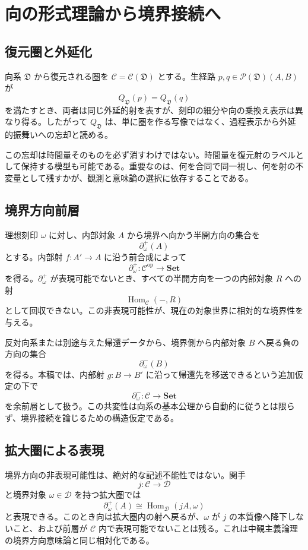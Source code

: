 \documentclass[a4paper,11pt]{ltjsarticle}
\theoremstyle{definition}
\theoremstyle{plain}
\newcommand{\Set}{\mathbf{Set}}
\newcommand{\Hom}{\operatorname{Hom}}
\begin{document}
\section{向の形式理論から境界接続へ}

\subsection{復元圏と外延化}

向系 $\mathfrak D$ から復元される圏を $\mathcal C=\mathcal C(\mathfrak D)$ とする。生経路 $p,q\in\mathcal P(\mathfrak D)(A,B)$ が
\[
 Q_{\mathfrak D}(p)=Q_{\mathfrak D}(q)
\]
を満たすとき、両者は同じ外延的射を表すが、刻印の細分や向の乗換え表示は異なり得る。したがって $Q_{\mathfrak D}$ は、単に圏を作る写像ではなく、過程表示から外延的振舞いへの忘却と読める。

この忘却は時間量そのものを必ず消すわけではない。時間量を復元射のラベルとして保持する模型も可能である。重要なのは、何を合同で同一視し、何を射の不変量として残すかが、観測と意味論の選択に依存することである。

\subsection{境界方向前層}

理想刻印 $\omega$ に対し、内部対象 $A$ から境界へ向かう半開方向の集合を
\[
 \partial_\omega^+(A)
\]
とする。内部射 $f:A'\to A$ に沿う前合成によって
\[
 \partial_\omega^+:
 \mathcal C^{\mathrm{op}}\longrightarrow\Set
\]
を得る。$\partial_\omega^+$ が表現可能でないとき、すべての半開方向を一つの内部対象 $R$ への射
\[
 \Hom_{\mathcal C}(-,R)
\]
として回収できない。この非表現可能性が、現在の対象世界に相対的な境界性を与える。

反対向系または別途与えた帰還データから、境界側から内部対象 $B$ へ戻る負の方向の集合
\[
 \partial_\omega^-(B)
\]
を得る。本稿では、内部射 $g:B\to B'$ に沿って帰還先を移送できるという追加仮定の下で
\[
 \partial_\omega^-:
 \mathcal C\longrightarrow\Set
\]
を余前層として扱う。この共変性は向系の基本公理から自動的に従うとは限らず、境界接続を論じるための構造仮定である。

\subsection{拡大圏による表現}

境界方向の非表現可能性は、絶対的な記述不能性ではない。関手
\[
 j:\mathcal C\longrightarrow\mathcal D
\]
と境界対象 $\omega\in\mathcal D$ を持つ拡大圏では
\[
 \partial_\omega^+(A)
 \cong
 \Hom_{\mathcal D}(jA,\omega)
\]
と表現できる。このとき向は拡大圏内の射へ戻るが、$\omega$ が $j$ の本質像へ降下しないこと、および前層が $\mathcal C$ 内で表現可能でないことは残る。これは中観主義論理の境界方向意味論と同じ相対化である\cite{ChibaMadhyic2026}。
\end{document}
